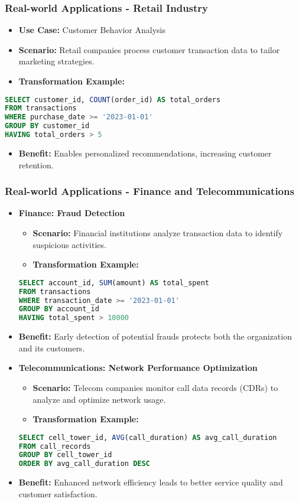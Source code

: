\documentclass[aspectratio=169]{beamer}
\begin{document}
\begin{frame}[fragile]
  \frametitle{Real-world Applications - Retail Industry}
  \begin{itemize}
    \item \textbf{Use Case:} Customer Behavior Analysis
    \item \textbf{Scenario:} Retail companies process customer transaction data to tailor marketing strategies.
    \item \textbf{Transformation Example:}
  \end{itemize}
  \begin{lstlisting}[language=SQL]
SELECT customer_id, COUNT(order_id) AS total_orders
FROM transactions
WHERE purchase_date >= '2023-01-01'
GROUP BY customer_id
HAVING total_orders > 5
  \end{lstlisting}
  \begin{itemize}
    \item \textbf{Benefit:} Enables personalized recommendations, increasing customer retention.
  \end{itemize}
\end{frame}

\begin{frame}[fragile]
  \frametitle{Real-world Applications - Finance and Telecommunications}
  \begin{itemize}
    \item \textbf{Finance: Fraud Detection}
      \begin{itemize}
        \item \textbf{Scenario:} Financial institutions analyze transaction data to identify suspicious activities.
        \item \textbf{Transformation Example:}
      \end{itemize}
      \begin{lstlisting}[language=SQL]
SELECT account_id, SUM(amount) AS total_spent
FROM transactions
WHERE transaction_date >= '2023-01-01'
GROUP BY account_id
HAVING total_spent > 10000
      \end{lstlisting}
      \item \textbf{Benefit:} Early detection of potential frauds protects both the organization and its customers.
    
    \item \textbf{Telecommunications: Network Performance Optimization}
      \begin{itemize}
        \item \textbf{Scenario:} Telecom companies monitor call data records (CDRs) to analyze and optimize network usage.
        \item \textbf{Transformation Example:}
      \end{itemize}
      \begin{lstlisting}[language=SQL]
SELECT cell_tower_id, AVG(call_duration) AS avg_call_duration
FROM call_records
GROUP BY cell_tower_id
ORDER BY avg_call_duration DESC
      \end{lstlisting}
      \item \textbf{Benefit:} Enhanced network efficiency leads to better service quality and customer satisfaction.
  \end{itemize}
\end{frame}
\end{document}
